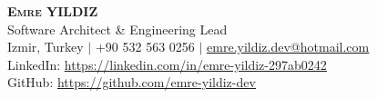 \begin{center}
    \textbf{\Huge \scshape Emre YILDIZ} \\ \vspace{2pt}
    \large Software Architect \& Engineering Lead \\ \vspace{2pt}
    Izmir, Turkey $|$ +90 532 563 0256 $|$ \href{mailto:emre.yildiz.dev@hotmail.com}{\underline{emre.yildiz.dev@hotmail.com}} \\ \vspace{1pt}
    LinkedIn: \href{https://linkedin.com/in/emre-yildiz-297ab0242}{\underline{https://linkedin.com/in/emre-yildiz-297ab0242}} \\ \vspace{1pt}
    GitHub: \href{https://github.com/emre-yildiz-dev}{\underline{https://github.com/emre-yildiz-dev}}
\end{center}